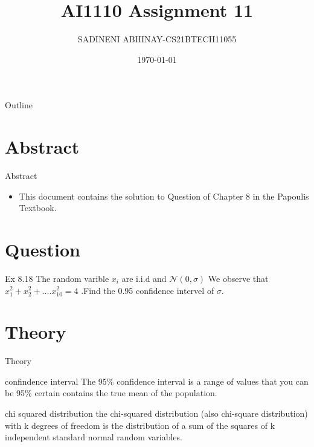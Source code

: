 \documentclass{beamer}
\title{AI1110 Assignment 11}
\author{SADINENI ABHINAY-CS21BTECH11055}
\date{\today}
\providecommand{\brak}[1]{\ensuremath{\left(#1\right)}}
\begin{document}
	
	\begin{frame}
		\titlepage
	\end{frame}

\begin{frame}{Outline}
  \tableofcontents
\end{frame}

\section{Abstract}
	\begin{frame}{Abstract}
		\begin{itemize}
			\item 	This document contains the solution to Question of Chapter 8  in the Papoulis Textbook.
		\end{itemize}
	\end{frame}
	
	\section{Question}
	\begin{frame}
	\begin{block}{Ex 8.18}
	The random varible $x_i$ are i.i.d and $\mathcal{N}\brak{0,\sigma}$ We observe that $x_1^2+x_2^2+....x_{10} ^{2}=4$ .Find the 0.95 confidence intervel of $\sigma$.  
	\end{block}
	\end{frame}
	\section{Theory}
	\begin{frame}{Theory}
	\begin{block}{confindence interval}
	The 95\% confidence interval is a range of values that you can be 95\% certain contains the true mean of the population.
	\end{block}
	\begin{block}{chi squared distribution}
	the chi-squared distribution (also chi-square distribution) with k degrees of freedom is the distribution of a sum of the squares of k independent standard normal random variables.
	\end{block}
	\end{frame}
\end{document}
